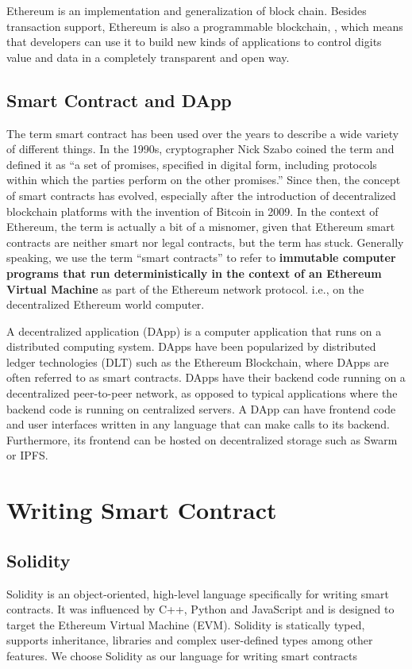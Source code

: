 \documentclass{article}
\begin{document}
Ethereum is an implementation and generalization of block chain. Besides transaction support, Ethereum is also a programmable blockchain, , which means that developers can use it to build new kinds of applications to control digits value and data in a completely transparent and open way.

\subsection{Smart Contract and DApp}
The term smart contract has been used over the years to describe a wide variety of different things. In the 1990s, cryptographer Nick Szabo coined the term and defined it as “a set of promises, specified in digital form, including protocols within which the parties perform on the other promises.” Since then, the concept of smart contracts has evolved, especially after the introduction of decentralized blockchain platforms with the invention of Bitcoin in 2009. In the context of Ethereum, the term is actually a bit of a misnomer, given that Ethereum smart contracts are neither smart nor legal contracts, but the term has stuck. Generally speaking, we use the term “smart contracts” to refer to \textbf{immutable computer programs that run deterministically in the context of an Ethereum Virtual Machine} as part of the Ethereum network protocol. i.e., on the decentralized Ethereum world computer.

A decentralized application (DApp) is a computer application that runs on a distributed computing system. DApps have been popularized by distributed ledger technologies (DLT) such as the Ethereum Blockchain, where DApps are often referred to as smart contracts. DApps have their backend code running on a decentralized peer-to-peer network, as opposed to typical applications where the backend code is running on centralized servers. A DApp can have frontend code and user interfaces written in any language that can make calls to its backend. Furthermore, its frontend can be hosted on decentralized storage such as Swarm or IPFS.

\section{Writing Smart Contract}
\subsection{Solidity}
Solidity is an object-oriented, high-level language specifically for writing smart contracts. It was influenced by C++, Python and JavaScript and is designed to target the Ethereum Virtual Machine (EVM). Solidity is statically typed, supports inheritance, libraries and complex user-defined types among other features. We choose Solidity as our language for writing smart contracts 
\end{document}
